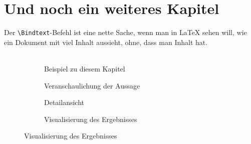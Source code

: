 

\chapter{Und noch ein weiteres Kapitel}
\Blindtext Der \verb$\Bindtext$-Befehl ist eine nette Sache, wenn man in \LaTeX{} sehen will, wie ein Dokument mit viel Inhalt aussieht, ohne, dass man Inhalt hat.\\
\\
\begin{figure}[h] %
	\begin{subfigure}{.5\textwidth}
		\centering
		\caption{Beispiel zu diesem Kapitel}
		\label{example}
	\end{subfigure}
	\begin{subfigure}{.5\textwidth}
		\centering
		\caption{Veranschaulichung der Aussage}
		\label{illustration}
	\end{subfigure}
	
	\begin{subfigure}{.5\textwidth}
		\centering
		\caption{Detailansicht}
		\label{detail}
	\end{subfigure}
	\begin{subfigure}{.5\textwidth}
		\centering
		\caption{Visualisierung des Ergebnisses}
		\label{visualization}
	\end{subfigure}
\end{figure}

